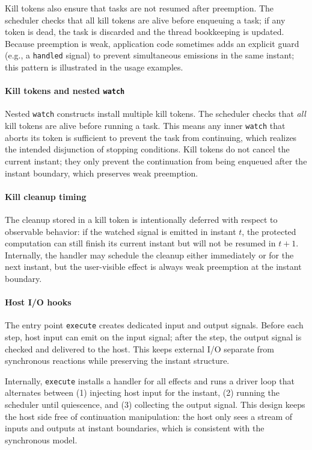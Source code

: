 Kill tokens also ensure that tasks are not resumed after preemption. The
scheduler checks that all kill tokens are alive before enqueuing a task; if any
token is dead, the task is discarded and the thread bookkeeping is updated.
Because preemption is weak, application code sometimes adds an explicit guard
(e.g., a \texttt{handled} signal) to prevent simultaneous emissions in the same
instant; this pattern is illustrated in the usage examples.

\paragraph{Kill tokens and nested \texttt{watch}}
Nested \texttt{watch} constructs install multiple kill tokens. The scheduler
checks that \emph{all} kill tokens are alive before running a task. This means
any inner \texttt{watch} that aborts its token is sufficient to prevent the
task from continuing, which realizes the intended disjunction of stopping
conditions. Kill tokens do not cancel the current instant; they only prevent
the continuation from being enqueued after the instant boundary, which
preserves weak preemption.

\paragraph{Kill cleanup timing}
The cleanup stored in a kill token is intentionally deferred with respect to
observable behavior: if the watched signal is emitted in instant $t$, the
protected computation can still finish its current instant but will not be
resumed in $t{+}1$. Internally, the handler may schedule the cleanup either
immediately or for the next instant, but the user-visible effect is always
weak preemption at the instant boundary.

\paragraph{Host I/O hooks}
The entry point \texttt{execute} creates dedicated input and output signals.
Before each step, host input can emit on the input signal; after the step, the
output signal is checked and delivered to the host. This keeps external I/O
separate from synchronous reactions while preserving the instant structure.

Internally, \texttt{execute} installs a handler for all effects and runs a
driver loop that alternates between (1) injecting host input for the instant,
(2) running the scheduler until quiescence, and (3) collecting the output
signal. This design keeps the host side free of continuation manipulation: the
host only sees a stream of inputs and outputs at instant boundaries, which is
consistent with the synchronous model.

